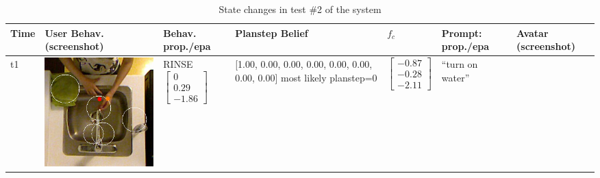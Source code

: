 %

\begin{longtable}{| V{0.8cm} | V{2.6cm} | V{1.6cm} | V{2.1cm} | V{1.55cm} | V{1.6cm} | V{3.2cm} |}
\caption{State changes in test \#2 of the system}
\label{table:result-2}
\\ \hline


Time &
User Behav. (screenshot) &
Behav. prop./epa &
Planstep Belief &
$f_c$ &
Prompt: prop./epa &
Avatar (screenshot) \\ \hline
\endhead

t1 &
\includegraphics[width=\linewidth]{fig/system/_slow2-rinse1_.jpg} &
RINSE
\linebreak\linebreak
$\begin{bmatrix}
0 \\
0.29 \\
-1.86
\end{bmatrix}$ &
[1.00, 0.00, 0.00, 0.00, 0.00, 0.00, 0.00, 0.00] most likely planstep=0 &
$\begin{bmatrix}
-0.87 \\
-0.28 \\
-2.11
\end{bmatrix}$ &
``turn on water''
\linebreak\linebreak

\end{longtable}
